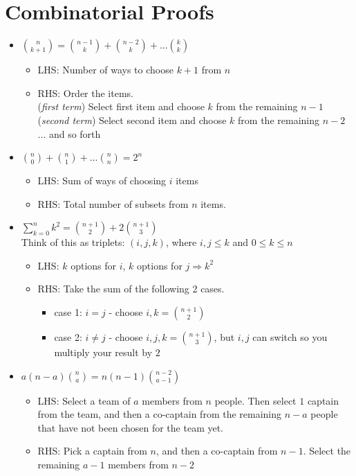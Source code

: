\documentclass[a4paper]{article}
\begin{document}
\section{Combinatorial Proofs}
\begin{itemize}
    \item $\binom{n}{k+1} = \binom{n-1}{k}+ \binom{n-2}{k} + ... \binom{k}{k}$
    \begin{itemize}
        \item LHS: Number of ways to choose $k+1$ from $n$
        \item RHS: Order the items. \\(\textit{first term}) Select first item and choose $k$ from the remaining $n-1$\\ (\textit{second term}) Select second item and choose $k$ from the remaining $n-2$ ... and so forth
    \end{itemize}
    \item $\binom{n}{0} + \binom{n}{1} + ... \binom{n}{n} = 2^n$
    \begin{itemize}
        \item LHS: Sum of ways of choosing $i$ items
        \item RHS: Total number of subsets from $n$ items.
    \end{itemize}
    \item $\sum_{k=0}^{n}k^2 = \binom{n+1}{2} + 2\binom{n+1}{3}$\\
    Think of this as triplets: $(i,j,k)$, where $i,j \leq k$ and $0 \leq k \leq n$
    \begin{itemize}
        \item LHS: $k$ options for $i$, $k$ options for $j \Rightarrow k^2$
        \item RHS: Take the sum of the following 2 cases.
        \begin{itemize}
            \item case 1: $i = j$ - choose $i, k = \binom{n+1}{2}$
            \item case 2: $i \neq j$ - choose $i, j, k = \binom{n+1}{3}$, but $i,j$ can switch so you multiply your result by $2$
        \end{itemize}
    \end{itemize}
    \item $a(n-a)\binom{n}{a} = n(n-1)\binom{n-2}{a-1}$
    \begin{itemize}
        \item LHS: Select a team of $a$ members from $n$ people. Then select $1$ captain from the team, and then a co-captain from the remaining $n-a$ people that have not been chosen for the team yet.
        \item RHS: Pick a captain from $n$, and then a co-captain from $n-1$. Select the remaining $a-1$ members from $n-2$

    \end{itemize}

\end{itemize}
\end{document}

